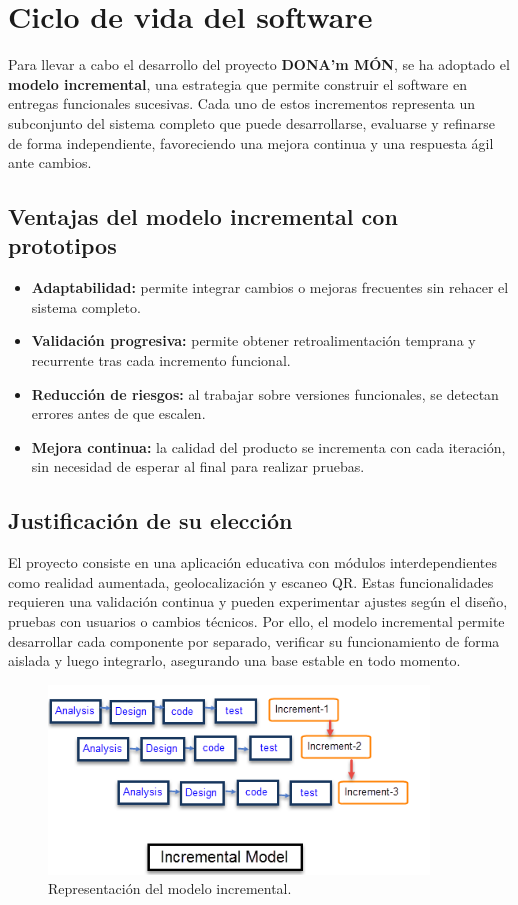 \section{Ciclo de vida del software}

Para llevar a cabo el desarrollo del proyecto \textbf{DONA'm M\'ON}, se ha adoptado el \textbf{modelo incremental}, una estrategia que permite construir el software en entregas funcionales sucesivas. Cada uno de estos incrementos representa un subconjunto del sistema completo que puede desarrollarse, evaluarse y refinarse de forma independiente, favoreciendo una mejora continua y una respuesta ágil ante cambios.

\subsection*{Ventajas del modelo incremental con prototipos}
\begin{itemize}
    \item \textbf{Adaptabilidad:} permite integrar cambios o mejoras frecuentes sin rehacer el sistema completo.
    \item \textbf{Validación progresiva:} permite obtener retroalimentación temprana y recurrente tras cada incremento funcional.
    \item \textbf{Reducción de riesgos:} al trabajar sobre versiones funcionales, se detectan errores antes de que escalen.
    \item \textbf{Mejora continua:} la calidad del producto se incrementa con cada iteración, sin necesidad de esperar al final para realizar pruebas.
\end{itemize}

\subsection*{Justificación de su elección}
El proyecto consiste en una aplicación educativa con módulos interdependientes como realidad aumentada, geolocalización y escaneo QR. Estas funcionalidades requieren una validación continua y pueden experimentar ajustes según el diseño, pruebas con usuarios o cambios técnicos. Por ello, el modelo incremental permite desarrollar cada componente por separado, verificar su funcionamiento de forma aislada y luego integrarlo, asegurando una base estable en todo momento.

\begin{figure}[H]
    \centering
    \includegraphics[width=0.9\textwidth]{figs/modelo_incremental.png}
    \caption{Representación del modelo incremental.}
    \label{fig:modelo-incremental}
\end{figure}

